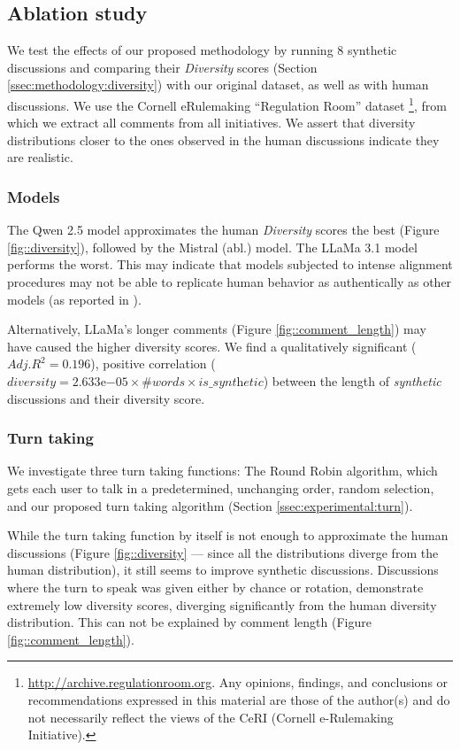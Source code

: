 \subsection{Ablation study}

We test the effects of our proposed methodology by running $8$ synthetic discussions and comparing their \textit{Diversity} scores (Section \ref{ssec:methodology:diversity}) with our original dataset, as well as with human discussions. We use the Cornell eRulemaking “Regulation Room” dataset \footnote{\url{http://archive.regulationroom.org}. Any opinions, findings, and conclusions or recommendations expressed in this material are those of the author(s) and do not necessarily reflect the views of the CeRI (Cornell e-Rulemaking Initiative).}, from which we extract all comments from all initiatives. We assert that diversity distributions closer to the ones observed in the human discussions indicate they are realistic.


\subsubsection{Models}

The Qwen 2.5 model approximates the human \textit{Diversity} scores the best (Figure \ref{fig::diversity}), followed by the Mistral (abl.) model. The LLaMa 3.1 model performs the worst. This may indicate that models subjected to intense alignment procedures may not be able to replicate human behavior as authentically as other models (as reported in \citet{Park2023GenerativeAI}). 

Alternatively, LLaMa's longer comments (Figure \ref{fig::comment_length}) may have caused the higher diversity scores. We find a qualitatively significant  ($Adj. R^2=0.196$), positive correlation ($\textit{diversity} = 2.633\mathrm{e}{-05} \times \textit{\#words} \times \textit{is\_synthetic}$) between the length of \textit{synthetic} discussions and their diversity score.


\subsubsection{Turn taking}

We investigate three turn taking functions: The Round Robin algorithm, which gets each user to talk in a predetermined, unchanging order, random selection, and our proposed turn taking algorithm (Section \ref{ssec:experimental:turn}).

While the turn taking function by itself is not enough to approximate the human discussions (Figure \ref{fig::diversity} — since all the distributions diverge from the human distribution), it still seems to improve synthetic discussions. Discussions where the turn to speak was given either by chance or rotation, demonstrate extremely low diversity scores, diverging significantly from the human diversity distribution. This can not be explained by comment length (Figure \ref{fig::comment_length}).


